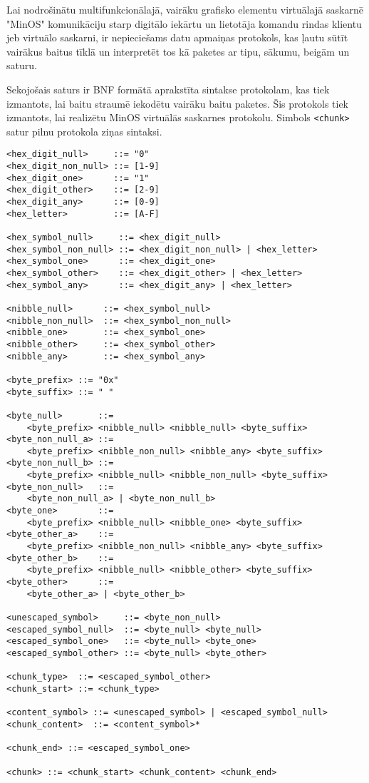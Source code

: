 Lai nodrošinātu multifunkcionālajā, vairāku grafisko elementu virtuālajā
saskarnē "MinOS" komunikāciju starp digitālo iekārtu un lietotāja komandu rindas
klientu jeb virtuālo saskarni, ir nepieciešams datu apmaiņas protokols, kas
ļautu sūtīt vairākus baitus tīklā un interpretēt tos kā paketes ar tipu, sākumu,
beigām un saturu.

Sekojošais saturs ir BNF formātā aprakstīta sintakse protokolam, kas tiek
izmantots, lai baitu straumē iekodētu vairāku baitu paketes. Šis protokols tiek
izmantots, lai realizētu MinOS virtuālās saskarnes protokolu. Simbols
\lstinline!<chunk>! satur pilnu protokola ziņas sintaksi. 

\begin{lstlisting}
<hex_digit_null>     ::= "0"
<hex_digit_non_null> ::= [1-9]
<hex_digit_one>      ::= "1"
<hex_digit_other>    ::= [2-9]
<hex_digit_any>      ::= [0-9]
<hex_letter>         ::= [A-F]

<hex_symbol_null>     ::= <hex_digit_null>
<hex_symbol_non_null> ::= <hex_digit_non_null> | <hex_letter>
<hex_symbol_one>      ::= <hex_digit_one>
<hex_symbol_other>    ::= <hex_digit_other> | <hex_letter>
<hex_symbol_any>      ::= <hex_digit_any> | <hex_letter>

<nibble_null>      ::= <hex_symbol_null>
<nibble_non_null>  ::= <hex_symbol_non_null>
<nibble_one>       ::= <hex_symbol_one>
<nibble_other>     ::= <hex_symbol_other>
<nibble_any>       ::= <hex_symbol_any>

<byte_prefix> ::= "0x"
<byte_suffix> ::= " "

<byte_null>       ::= 
    <byte_prefix> <nibble_null> <nibble_null> <byte_suffix>
<byte_non_null_a> ::= 
    <byte_prefix> <nibble_non_null> <nibble_any> <byte_suffix>
<byte_non_null_b> ::= 
    <byte_prefix> <nibble_null> <nibble_non_null> <byte_suffix>
<byte_non_null>   ::= 
    <byte_non_null_a> | <byte_non_null_b>
<byte_one>        ::= 
    <byte_prefix> <nibble_null> <nibble_one> <byte_suffix>
<byte_other_a>    ::= 
    <byte_prefix> <nibble_non_null> <nibble_any> <byte_suffix>
<byte_other_b>    ::= 
    <byte_prefix> <nibble_null> <nibble_other> <byte_suffix>
<byte_other>      ::= 
    <byte_other_a> | <byte_other_b>

<unescaped_symbol>     ::= <byte_non_null>
<escaped_symbol_null>  ::= <byte_null> <byte_null>
<escaped_symbol_one>   ::= <byte_null> <byte_one>
<escaped_symbol_other> ::= <byte_null> <byte_other>

<chunk_type>  ::= <escaped_symbol_other>
<chunk_start> ::= <chunk_type>

<content_symbol> ::= <unescaped_symbol> | <escaped_symbol_null>
<chunk_content>  ::= <content_symbol>*

<chunk_end> ::= <escaped_symbol_one>

<chunk> ::= <chunk_start> <chunk_content> <chunk_end>
\end{lstlisting}

